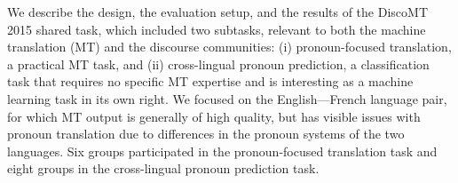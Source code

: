 We describe the design, the evaluation setup, and the results of the DiscoMT 2015 shared task, which included two subtasks, relevant to both the machine translation (MT) and the discourse communities: (i) pronoun-focused translation, a practical MT task, and (ii) cross-lingual pronoun prediction, a classification task that requires no specific MT expertise and is interesting as a machine learning task in its own right.  We focused on the English---French language pair, for which MT output is generally of high quality, but has visible issues with pronoun translation due to differences in the pronoun systems of the two languages. Six groups participated in the pronoun-focused translation task and eight groups in the cross-lingual pronoun prediction task.
